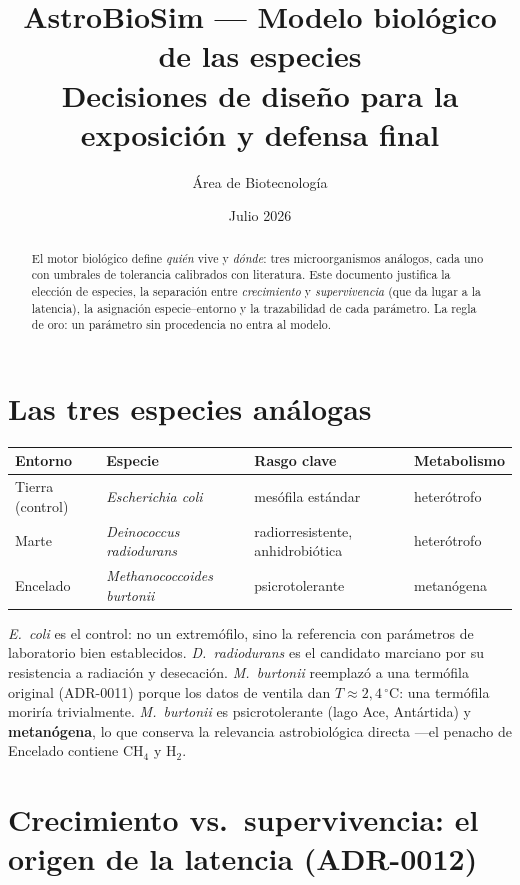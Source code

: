 \documentclass[11pt]{article}
\title{\textbf{AstroBioSim — Modelo biológico de las especies}\\[2pt]
\large Decisiones de diseño para la exposición y defensa final}
\author{Área de Biotecnología}
\date{Julio 2026}
\begin{document}
\maketitle

\begin{abstract}
\noindent El motor biológico define \emph{quién} vive y \emph{dónde}: tres
microorganismos análogos, cada uno con umbrales de tolerancia calibrados con
literatura. Este documento justifica la elección de especies, la separación entre
\emph{crecimiento} y \emph{supervivencia} (que da lugar a la latencia), la
asignación especie–entorno y la trazabilidad de cada parámetro. La regla de oro:
un parámetro sin procedencia no entra al modelo.
\end{abstract}

\section{Las tres especies análogas}

\begin{center}\small
\begin{tabular}{@{}llll@{}}
\toprule
Entorno & Especie & Rasgo clave & Metabolismo \\
\midrule
Tierra (control) & \emph{Escherichia coli} & mesófila estándar & heterótrofo \\
Marte & \emph{Deinococcus radiodurans} & radiorresistente, anhidrobiótica & heterótrofo \\
Encelado & \emph{Methanococcoides burtonii} & psicrotolerante & metanógena \\
\bottomrule
\end{tabular}
\end{center}

\emph{E.\ coli} es el control: no un extremófilo, sino la referencia con
parámetros de laboratorio bien establecidos. \emph{D.\ radiodurans} es el candidato
marciano por su resistencia a radiación y desecación. \emph{M.\ burtonii}
reemplazó a una termófila original (ADR-0011) porque los datos de ventila dan
$T\approx 2{,}4\,^\circ$C: una termófila moriría trivialmente. \emph{M.\ burtonii}
es psicrotolerante (lago Ace, Antártida) y \textbf{metanógena}, lo que conserva la
relevancia astrobiológica directa —el penacho de Encelado contiene CH$_4$ y H$_2$.

\section{Crecimiento vs.\ supervivencia: el origen de la latencia (ADR-0012)}
\end{document}
